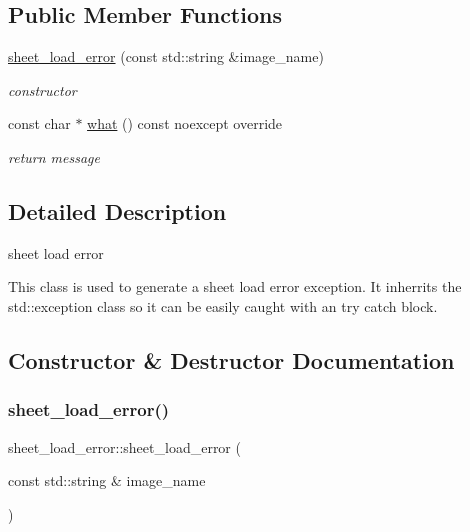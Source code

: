 \subsection*{Public Member Functions}
\begin{DoxyCompactItemize}
\item 
\hyperlink{classsheet__load__error_a80642b59420e3b58c1c5e980cf702c41}{sheet\+\_\+load\+\_\+error} (const std\+::string \&image\+\_\+name)
\begin{DoxyCompactList}\small\item\em constructor \end{DoxyCompactList}\item 
const char $\ast$ \hyperlink{classsheet__load__error_a57dd1a273a0720e58ec0eb667d0c85aa}{what} () const noexcept override
\begin{DoxyCompactList}\small\item\em return message \end{DoxyCompactList}\end{DoxyCompactItemize}


\subsection{Detailed Description}
sheet load error 

This class is used to generate a sheet load error exception. It inherrits the std\+::exception class so it can be easily caught with an try catch block. 

\subsection{Constructor \& Destructor Documentation}
\mbox{\label{classsheet__load__error_a80642b59420e3b58c1c5e980cf702c41}} 
\subsubsection{\texorpdfstring{sheet\+\_\+load\+\_\+error()}{sheet\_load\_error()}}
{\footnotesize\ttfamily sheet\+\_\+load\+\_\+error\+::sheet\+\_\+load\+\_\+error (\begin{DoxyParamCaption}\item[{const std\+::string \&}]{image\+\_\+name }\end{DoxyParamCaption})\hspace{0.3cm}{\ttfamily [inline]}}



